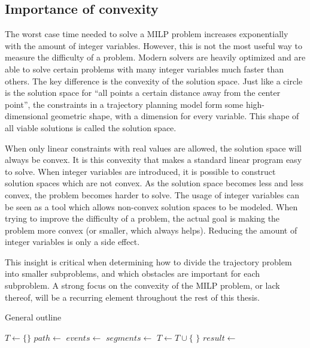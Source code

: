 \subsection{Importance of convexity}
The worst case time needed to solve a MILP problem increases exponentially with the amount of integer variables. However, this is not the most useful way to measure the difficulty of a problem. Modern solvers are heavily optimized and are able to solve certain problems with many integer variables much faster than others. The key difference is the convexity of the solution space. Just like a circle is the solution space for ``all points a certain distance away from the center point'', the constraints in a trajectory planning model form some high-dimensional geometric shape, with a dimension for every variable. This shape of all viable solutions is called the solution space.
\par
When only linear constraints with real values are allowed, the solution space will always be convex. It is this convexity that makes a standard linear program easy to solve. When integer variables are introduced, it is possible to construct solution spaces which are not convex. As the solution space becomes less and less convex, the problem becomes harder to solve. The usage of integer variables can be seen as a tool which allows non-convex solution spaces to be modeled. When trying to improve the difficulty of a problem, the actual goal is making the problem more convex (or smaller, which always helps). Reducing the amount of integer variables is only a side effect.
\par
This insight is critical when determining how to divide the trajectory problem into smaller subproblems, and which obstacles are important for each subproblem. A strong focus on the convexity of the MILP problem, or lack thereof, will be a recurring element throughout the rest of this thesis.
\newpage
\begin{algorithm}[t]
\caption{General outline}
\label{alg:outline}
\begin{algorithmic}[1]
\State $T \leftarrow \{\}$ 
\State $path \leftarrow$ 
\State $events \leftarrow$ 
\State $segments \leftarrow$ 
\State {}
\State {}
\State {}
\State $T \leftarrow T \cup \{$  $\}$
\EndFor
\State $result \leftarrow $
\end{algorithmic}
\end{algorithm}

